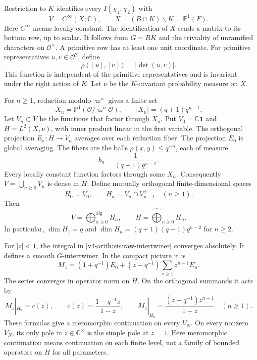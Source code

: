Restriction to $K$ identifies every $I(\chi_1,\chi_2)$ with
\[
 V=C^\infty(X;\mathbb C),\qquad X=(B\cap K)\backslash K=\mathbb P^1(F).
\]
Here $C^\infty$ means locally constant.
The identification of $X$ sends a matrix to its bottom row, up to scalar.
It follows from $G=BK$ and the triviality of unramified characters on
$\mathcal O^\times$.
A primitive row has at least one unit coordinate.
For primitive representatives $u,v\in\mathcal O^2$, define
\[
 \rho([u],[v])=|\det(u,v)|.
\]
This function is independent of the primitive representatives and is
invariant under the right action of $K$.
Let $\nu$ be the $K$-invariant probability measure on $X$.

For $n\ge1$, reduction modulo $\varpi^n$ gives a finite set
\[
 X_n=\mathbb P^1(\mathcal O/\varpi^n\mathcal O),\qquad
 |X_n|=(q+1)q^{n-1}.
\]
Let $V_n\subset V$ be the functions that factor through $X_n$.
Put $V_0=\mathbb C\mathbf1$ and
$H=L^2(X,\nu)$, with inner product linear in the first variable.
The orthogonal projection $E_n:H\to V_n$ averages over each reduction fiber.
The projection $E_0$ is global averaging.
The fibers are the balls $\rho(x,y)\le q^{-n}$, each of measure
\[
 b_n=\frac{1}{(q+1)q^{n-1}}.
\]
Every locally constant function factors through some $X_n$.
Consequently $V=\bigcup_{n\ge0}V_n$ is dense in $H$.
Define mutually orthogonal finite-dimensional spaces
\[
 H_0=V_0,\qquad H_n=V_n\cap V_{n-1}^{\perp}\quad(n\ge1).
\]
Then
\[
 V=\bigoplus_{n\ge0}^{\mathrm{alg}}H_n,
 \qquad H=\widehat{\bigoplus}_{n\ge0}H_n.
\]
In particular, $\dim H_1=q$ and
$\dim H_n=(q+1)(q-1)q^{n-2}$ for $n\ge2$.

\begin{lemma}
\label{v4-arith:eis:kernel}
For $|z|<1$, the integral in
\eqref{v4-arith:eis:raw-intertwiner} converges absolutely.
It defines a smooth $G$-intertwiner.
In the compact picture it is
\begin{equation}
\label{v4-arith:eis:projection-expansion}
 M_z=(1+q^{-1})E_0+(z-q^{-1})\sum_{n\ge1}z^{n-1}E_n.
\end{equation}
The series converges in operator norm on $H$.
On the orthogonal summands it acts by
\[
 M_z|_{H_0}=c(z),\qquad
 c(z)=\frac{1-q^{-1}z}{1-z},\qquad
 M_z|_{H_n}=\frac{(z-q^{-1})z^{n-1}}{1-z}\quad(n\ge1).
\]
These formulas give a meromorphic continuation on every $V_N$.
On every nonzero $V_N$, its only pole in $z\in\mathbb C^\times$
is the simple pole at $z=1$.
Here meromorphic continuation means continuation on each finite level,
not a family of bounded operators on $H$ for all parameters.
\end{lemma}

